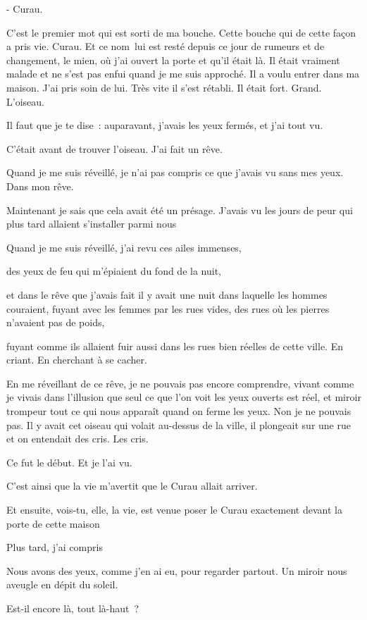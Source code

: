 - Curau.

C'est le premier mot qui est sorti de ma bouche. Cette bouche qui de
cette façon a pris vie. Curau. Et ce nom~lui est resté depuis ce jour de
rumeurs et de changement, le mien, où j'ai ouvert la porte et qu'il
était là. Il était vraiment malade et ne s'est pas enfui quand je me
suis approché. Il a voulu entrer dans ma maison. J'ai pris soin de lui.
Très vite il s'est rétabli. Il était fort. Grand. L'oiseau.

Il faut que je te dise~: auparavant, j'avais les yeux fermés, et j'ai
tout vu.

C'était avant de trouver l'oiseau. J'ai fait un rêve.

Quand je me suis réveillé, je n'ai pas compris ce que j'avais vu sans
mes yeux. Dans mon rêve.

Maintenant je sais que cela avait été un présage. J'avais vu les jours
de peur qui plus tard allaient s'installer parmi nous

Quand je me suis réveillé, j'ai revu ces ailes immenses,

des yeux de feu qui m'épiaient du fond de la nuit,

et dans le rêve que j'avais fait il y avait une nuit dans laquelle les
hommes couraient, fuyant avec les femmes par les rues vides, des rues où
les pierres n'avaient pas de poids,

fuyant comme ils allaient fuir aussi dans les rues bien réelles de cette
ville. En criant. En cherchant à se cacher.

En me réveillant de ce rêve, je ne pouvais pas encore comprendre, vivant
comme je vivais dans l'illusion que seul ce que l'on voit les yeux
ouverts est réel, et miroir trompeur tout ce qui nous apparaît quand on
ferme les yeux. Non je ne pouvais pas. Il y avait cet oiseau qui volait
au-dessus de la ville, il plongeait sur une rue et on entendait des
cris. Les cris.

Ce fut le début. Et je l'ai vu.

C'est ainsi que la vie m'avertit que le Curau allait arriver.

Et ensuite, vois-tu, elle, la vie, est venue poser le Curau exactement
devant la porte de cette maison

Plus tard, j'ai compris

Nous avons des yeux, comme j'en ai eu, pour regarder partout. Un miroir
nous aveugle en dépit du soleil.

Est-il encore là, tout là-haut~?

